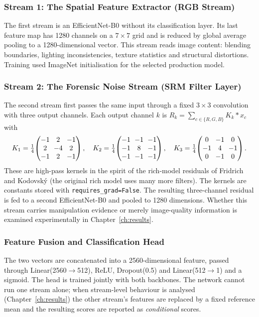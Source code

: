 \subsubsection{Stream 1: The Spatial Feature Extractor (RGB Stream)}
The first stream is an EfficientNet-B0 \citep{tan2019efficientnet} without its classification layer. Its last feature map has 1280 channels on
a $7\times7$ grid and is reduced by global average pooling to a 1280-dimensional vector. This stream reads image content: blending
boundaries, lighting inconsistencies, texture statistics and structural distortions. Training used ImageNet initialisation for the selected
production model.

\subsubsection{Stream 2: The Forensic Noise Stream (SRM Filter Layer)}
The second stream first passes the same input through a fixed $3\times3$ convolution with three output channels. Each output channel
$k$ is $R_k=\sum_{c\in\{R,G,B\}}K_k * x_c$ with
\begin{equation}\setlength{\arraycolsep}{3pt}
K_1=\tfrac14\!\begin{pmatrix}-1&2&-1\\2&-4&2\\-1&2&-1\end{pmatrix},\quad
K_2=\tfrac14\!\begin{pmatrix}-1&-1&-1\\-1&8&-1\\-1&-1&-1\end{pmatrix},\quad
K_3=\tfrac14\!\begin{pmatrix}0&-1&0\\-1&4&-1\\0&-1&0\end{pmatrix}.
\end{equation}
These are high-pass kernels in the spirit of the rich-model residuals of Fridrich and Kodovsk\'y \citep{fridrich2012srm} (the original rich
model uses many more filters). The kernels are constants stored with \texttt{requires\_grad=False}. The resulting three-channel residual is fed
to a second EfficientNet-B0 and pooled to 1280 dimensions. Whether this stream carries manipulation evidence or merely image-quality
information is examined experimentally in Chapter~\ref{ch:results}.

\subsubsection{Feature Fusion and Classification Head}
The two vectors are concatenated into a 2560-dimensional feature, passed through Linear(2560$\to$512), ReLU, Dropout(0.5) and
Linear(512$\to$1) and a sigmoid. The head is trained jointly with both backbones. The network cannot run one stream alone; when stream-level behaviour
is analysed (Chapter~\ref{ch:results}) the other stream's features are replaced by a fixed reference mean and the resulting scores are
reported as \emph{conditional} scores.

